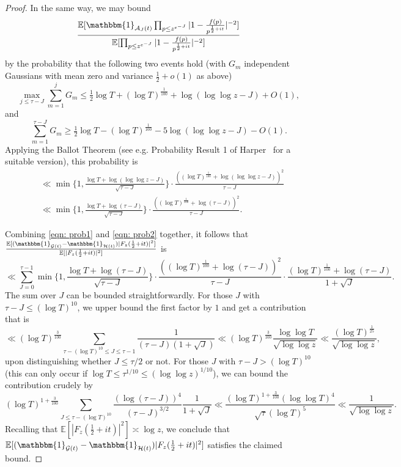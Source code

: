 \documentclass[12pt, notitlepage]{amsart}
\numberwithin{equation}{section}
\def\E{\mathbb E}
\theoremstyle{remark}
\theoremstyle{definition}
\theoremstyle{remark}
\numberwithin{equation}{section}
\begin{document}
\begin{proof}
 In the same way, we may bound 
\[
\frac{\E[\mathbbm{1}_{\mathcal{A}_J(t)} \prod_{ p\le z^{e^{-J}}} |1-\frac{f(p)}{p^{\frac 12+it}}|^{-2}]}{\E[ \prod_{  p\le z^{e^{-J}}} |1-\frac{f(p)}{p^{\frac 12+it}}|^{-2} ]}
\] 
by the probability that the following two events hold (with $G_m$ independent Gaussians with mean zero and variance $\tfrac 12+o(1)$ as above) 
\[ 
 \max_{j\le \tau-J} \sum_{m=1}^{j} G_m\le \tfrac{1}{2}\log T + (\log T)^{\frac 1{100}}  +  \log (\log \log z - J) +O(1),
 \] 
 and  
 \[ 
 \sum_{m=1}^{\tau-J} G_m \ge  \tfrac{1}{2}\log T - (\log T)^{\frac 1{100}}  -5 \log (\log \log z - J) -O(1).
 \]
 Applying the Ballot Theorem (see e.g. Probability Result 1 of Harper~\cite{harper2019partition} for a suitable version), this probability is 
\begin{align} \label{eqn: prob2}
& \ll \min\Big\{1, \frac{\log T + \log(\log \log z - J)}{\sqrt{\tau-J}}\Big\} \cdot \frac{((\log T)^{\frac 1{100}} + \log (\log \log z - J ) )^{2}}{\tau - J} \nonumber \\ 
 & \ll \min\Big\{1, \frac{\log T + \log(\tau - J)}{\sqrt{\tau-J}}\Big\} \cdot \frac{((\log T)^{\frac 1{100}} + \log (\tau - J ) )^{2}}{\tau - J} .   
\end{align}


 Combining \eqref{eqn: prob1} and \eqref{eqn: prob2} together, it follows that  $\frac{\E[(\mathbbm{1}_{\mathcal{G}(t)}-\mathbbm{1}_{\mathcal{H}(t)}) |F_z(\frac{1}{2}+it)|^{2}]}{\E[|F_z(\frac{1}{2}+it)|^{2}]} $ is
 \[
   \ll \sum_{J=0}^{\tau -1} \min\Big\{1, \frac{\log T + \log(\tau - J)}{\sqrt{\tau-J}}\Big\}  \cdot \frac{((\log T)^{\frac{1}{100}} + \log (\tau - J ) )^{2}}{\tau - J} \cdot \frac{(\log T)^{\frac{1}{100}} + \log (\tau - J) }{1+\sqrt{J}} .
 \]
The sum over $J$ can be bounded straightforwardly.   For those $J$ with $\tau-J\le (\log T)^{10}$, we upper bound the first factor  by $1$ and get a contribution that is 
\[ 
\ll (\log T)^{\frac{3}{100}}   \sum_{\tau- (\log T)^{10} \le J \le \tau-1 } \frac{1}{(\tau - J)(1+\sqrt{J})} \ll (\log T)^{\frac 3{100}} \frac{\log \log T}{\sqrt{\log \log z}} \ll \frac{(\log T)^{\frac 1{25}}}{\sqrt{\log \log z}},
\]
upon distinguishing whether $J\le \tau/2$ or not.   
For those $J$ with $\tau-J> (\log  T)^{10}$ (this can only occur if $\log T \leq \tau^{1/10} \leq (\log\log z)^{1/10}$), we can bound the contribution crudely by 
  \[    (\log T)^{1+\frac{3}{100}} \sum_{J\le \tau - (\log T)^{10}} \frac{(\log (\tau -J))^4}{(\tau -J)^{3/2}} \frac{1}{1 + \sqrt{J}}  \ll \frac{(\log T)^{1+\frac{3}{100}} (\log\log T)^4}{\sqrt{\tau} (\log T)^5} \ll \frac{1}{\sqrt{\log \log z}} .     \]
Recalling that $\E[|F_z(\frac{1}{2}+it)|^{2}] \asymp \log z$, we conclude that $\E[(\mathbbm{1}_{\mathcal{G}(t)}-\mathbbm{1}_{\mathcal{H}(t)}) |F_z(\frac{1}{2}+it)|^{2}]$ satisfies the claimed bound.
\end{proof}
\end{document}
